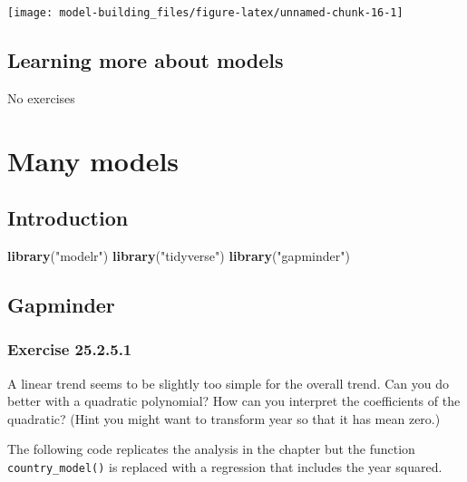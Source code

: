 \documentclass[]{book}
\newenvironment{Shaded}{\begin{snugshade}}{\end{snugshade}}
\newcommand{\KeywordTok}[1]{\textcolor[rgb]{0.13,0.29,0.53}{\textbf{#1}}}
\newcommand{\NormalTok}[1]{#1}
\newcommand{\StringTok}[1]{\textcolor[rgb]{0.31,0.60,0.02}{#1}}
\theoremstyle{plain}
\theoremstyle{remark}
\begin{document}
\begin{center}\texttt{[image: model-building\_files/figure-latex/unnamed-chunk-16-1]} \end{center}

\hypertarget{learning-more-about-models}{%
\section{Learning more about models}\label{learning-more-about-models}}

No exercises

\hypertarget{many-models}{%
\chapter{Many models}\label{many-models}}

\hypertarget{introduction-16}{%
\section{Introduction}\label{introduction-16}}

\begin{Shaded}
\begin{Highlighting}[]
\KeywordTok{library}\NormalTok{(}\StringTok{"modelr"}\NormalTok{)}
\KeywordTok{library}\NormalTok{(}\StringTok{"tidyverse"}\NormalTok{)}
\KeywordTok{library}\NormalTok{(}\StringTok{"gapminder"}\NormalTok{)}
\end{Highlighting}
\end{Shaded}

\hypertarget{gapminder}{%
\section{Gapminder}\label{gapminder}}

\hypertarget{exercise-25.2.5.1}{%
\subsection*{\texorpdfstring{Exercise
{25.2.5.1}}{Exercise 25.2.5.1}}\label{exercise-25.2.5.1}}

A linear trend seems to be slightly too simple for the overall trend.
Can you do better with a quadratic polynomial? How can you interpret the
coefficients of the quadratic? (Hint you might want to transform year so
that it has mean zero.)

The following code replicates the analysis in the chapter but the
function \texttt{country\_model()} is replaced with a regression that
includes the year squared.
\end{document}

